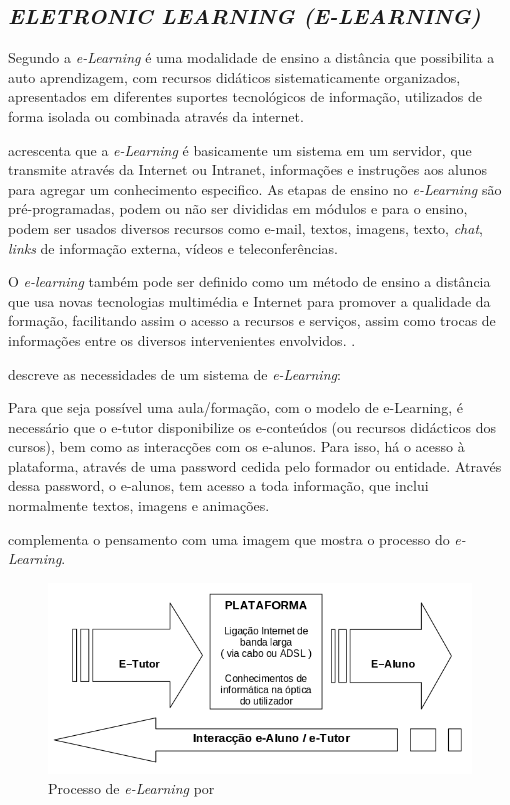 \newpage
\subsection{\textit{ELETRONIC LEARNING (E-LEARNING)}}
Segundo  a \textit{e-Learning} é uma modalidade de ensino a distância que possibilita a auto aprendizagem, com recursos didáticos sistematicamente organizados, apresentados em diferentes suportes tecnológicos de informação, utilizados de forma isolada ou combinada através da internet.
\par
{} acrescenta que a \textit{e-Learning} é basicamente um sistema em um servidor, que transmite através da Internet ou Intranet, informações e instruções aos alunos para agregar um conhecimento especifico. As etapas de ensino no \textit{e-Learning} são pré-programadas, podem ou não ser divididas em módulos e para o ensino, podem ser usados diversos recursos como e-mail, textos, imagens, texto, \textit{chat}, \textit{links} de informação externa, vídeos e teleconferências.
\par
O \textit{e-learning} também pode ser definido como um método de ensino a distância que usa novas tecnologias multimédia e Internet para promover a qualidade da formação, facilitando assim o acesso a recursos e serviços, assim como trocas de informações entre os diversos intervenientes envolvidos. \cite{spi}.
\par
\cite[p.~3]{barbosa} descreve as necessidades de um sistema de \textit{e-Learning}:
\begin{citacao}
  Para que seja possível uma aula/formação, com o modelo de e-Learning, é necessário que o e-tutor disponibilize os e-conteúdos (ou recursos didácticos dos cursos), bem como as interacções com os e-alunos. Para isso, há o acesso à plataforma, através de uma password cedida pelo formador ou entidade. Através dessa password, o e-alunos, tem acesso a toda informação, que inclui normalmente textos, imagens e animações.
\end{citacao}
 complementa o pensamento com uma imagem que mostra o processo do \textit{e-Learning}.

\begin{figure}[h]
  \centering
  \label{fig:e-learning-caracterização-barbosa}
  \includegraphics[keepaspectratio=true,scale=0.6]{figuras/e-learning-barbosa.png}
  \caption{Processo de \textit{e-Learning} por }
\end{figure}


